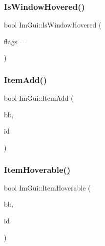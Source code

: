 \mbox{\label{namespace_im_gui_aaed1ebf40cc2cb2ec30b0ba39b91d4a5}} 
\subsubsection{\texorpdfstring{Is\+Window\+Hovered()}{IsWindowHovered()}}
{\footnotesize\ttfamily bool Im\+Gui\+::\+Is\+Window\+Hovered (\begin{DoxyParamCaption}\item[{\mbox{\hyperlink{imgui_8h_a3a8f688665e5ea0bd9700e1251580a2c}{Im\+Gui\+Hovered\+Flags}}}]{flags = {} }\end{DoxyParamCaption})}

\mbox{\label{namespace_im_gui_a454e81b7c3befcc51c900f2fb3bd5a9a}} 
\subsubsection{\texorpdfstring{Item\+Add()}{ItemAdd()}}
{\footnotesize\ttfamily bool Im\+Gui\+::\+Item\+Add (\begin{DoxyParamCaption}\item[{const \mbox{\hyperlink{struct_im_rect}{Im\+Rect}} \&}]{bb,  }\item[{\mbox{\hyperlink{imgui_8h_a1785c9b6f4e16406764a85f32582236f}{Im\+Gui\+ID}}}]{id }\end{DoxyParamCaption})}

\mbox{\label{namespace_im_gui_a488b86a9f235923304186fb86ff64ffb}} 
\subsubsection{\texorpdfstring{Item\+Hoverable()}{ItemHoverable()}}
{\footnotesize\ttfamily bool Im\+Gui\+::\+Item\+Hoverable (\begin{DoxyParamCaption}\item[{const \mbox{\hyperlink{struct_im_rect}{Im\+Rect}} \&}]{bb,  }\item[{\mbox{\hyperlink{imgui_8h_a1785c9b6f4e16406764a85f32582236f}{Im\+Gui\+ID}}}]{id }\end{DoxyParamCaption})}

